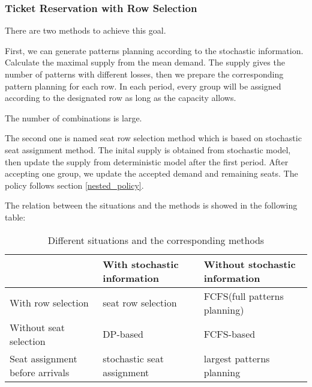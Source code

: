 

\subsubsection{Ticket Reservation with Row Selection}
There are two methods to achieve this goal.

First, we can generate patterns planning according to the stochastic information. Calculate the maximal supply from the mean demand. The supply gives the number of patterns with different losses, then we prepare the corresponding pattern planning for each row. In each period, every group will be assigned according to the designated row as long as the capacity allows. 

The number of combinations is large.

The second one is named seat row selection method which is based on stochastic seat assignment method. The inital supply is obtained from stochastic model, then update the supply from deterministic model after the first period. After accepting one group, we update the accepted demand and remaining seats. The policy follows section \ref{nested_policy}.








The relation between the situations and the methods is showed in the following table:
\begin{table}[ht]
  \centering
  \caption{Different situations and the corresponding methods}
  \begin{tabular}{|l|l|l|}
  \hline
   & With stochastic information & Without stochastic information \\
  \hline
  With row selection    & seat row selection & FCFS(full patterns planning) \\
  \hline
  Without seat selection & DP-based & FCFS-based \\
  \hline
  Seat assignment before arrivals & stochastic seat assignment & largest patterns planning \\
  \hline
  \end{tabular}
\end{table}



